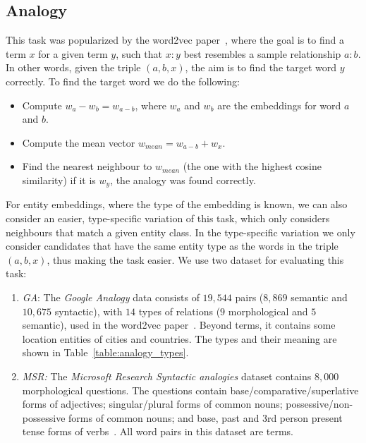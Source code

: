 \subsection{Analogy}
This task was popularized by the word2vec paper~, where the goal is to find a term $x$ for a given term $y$, such that  $x : y$ best resembles a sample relationship $a : b$. In other words, given the triple $(a,b,x)$, the aim is to find the target word $y$ correctly. To find the target word we do the following:  
\begin{itemize}
    \item Compute $w_a-w_b=w_{a-b}$, where $w_a$ and $w_b$ are the embeddings for word $a$ and $b$. 
    \item  Compute the mean vector $w_{mean}=w_{a-b}+w_x$.
    \item  Find the nearest neighbour to $w_{mean}$ (the one with the highest cosine similarity) if it is $w_y$, the analogy was found correctly.
  \end{itemize}
  \noindent
For entity embeddings, where the type of the embedding is known, we can also consider an easier, type-specific variation of this task, which only considers neighbours that match a given entity class. In the type-specific variation we only consider candidates that have the same entity type as the words in the triple $(a,b,x)$, thus making the task easier. We use two dataset for evaluating this task: 
\begin{enumerate}
 \item \emph{GA}: The \emph{Google Analogy} data consists of $19,544$ pairs ($8,869$ semantic and $10,675$ syntactic), with $14$ types of relations ($9$ morphological and $5$ semantic), used in the word2vec paper~. Beyond terms, it contains some location entities of cities and countries. The types and their meaning are shown in Table~\ref{table:analogy_types}.
\item \emph{MSR:} The \emph{Microsoft Research Syntactic analogies} dataset contains $8,000$ morphological questions. The questions contain base/comparative/superlative forms of adjectives; singular/plural forms of common nouns; possessive/non-possessive forms of common nouns; and base, past and 3rd person present tense forms of verbs~\cite{DBLP:conf/naacl/MikolovYZ13}. All word pairs in this dataset are terms.
\end{enumerate}


